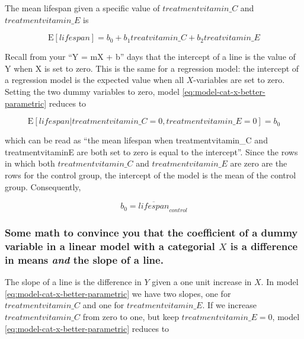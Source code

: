 \documentclass[]{book}
\begin{document}
The mean lifespan given a specific value of \(treatmentvitamin\_C\) and \(treatmentvitamin\_E\) is

\begin{equation}
\mathrm{E}[lifespan] = b_0 + b_1 treatvitamin\_C + b_2 treatvitamin\_E
\label{eq:model-cat-x-better-parametric}
\end{equation}

Recall from your ``Y = mX + b'' days that the intercept of a line is the value of Y when X is set to zero. This is the same for a regression model: the intercept of a regression model is the expected value when all \(X\)-variables are set to zero. Setting the two dummy variables to zero, model \eqref{eq:model-cat-x-better-parametric} reduces to

\begin{equation}
\mathrm{E}[lifespan|treatmentvitamin\_C=0, treatmentvitamin\_E=0] = b_0
\end{equation}

which can be read as ``the mean lifespan when treatmentvitamin\_C and treatmentvitaminE are both set to zero is equal to the intercept''. Since the rows in which both \(treatmentvitamin\_C\) and \(treatmentvitamin\_E\) are zero are the rows for the control group, the intercept of the model is the mean of the control group. Consequently,

\begin{equation}
b_0 = \overline{lifespan}_{control}
\end{equation}

\hypertarget{some-math-to-convince-you-that-the-coefficient-of-a-dummy-variable-in-a-linear-model-with-a-categorial-x-is-a-difference-in-means-and-the-slope-of-a-line.}{%
\subsubsection{\texorpdfstring{Some math to convince you that the coefficient of a dummy variable in a linear model with a categorial \(X\) is a difference in means \emph{and} the slope of a line.}{Some math to convince you that the coefficient of a dummy variable in a linear model with a categorial X is a difference in means and the slope of a line.}}\label{some-math-to-convince-you-that-the-coefficient-of-a-dummy-variable-in-a-linear-model-with-a-categorial-x-is-a-difference-in-means-and-the-slope-of-a-line.}}

The slope of a line is the difference in \(Y\) given a one unit increase in \(X\). In model \eqref{eq:model-cat-x-better-parametric} we have two slopes, one for \(treatmentvitamin\_C\) and one for \(treatmentvitamin\_E\). If we increase \(treatmentvitamin\_C\) from zero to one, but keep \(treatmentvitamin\_E = 0\), model \eqref{eq:model-cat-x-better-parametric} reduces to
\end{document}
